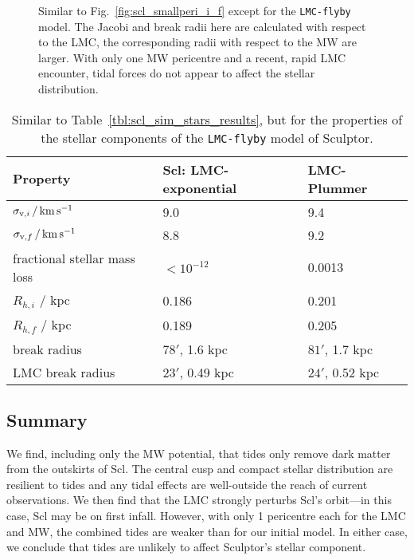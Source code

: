 \begin{figure}
\centering
{}
\caption[Sculptor initial and final density with LMC]{Similar to
Fig.~\ref{fig:scl_smallperi_i_f} except for the \texttt{LMC-flyby}
model. The Jacobi and break radii here are calculated with respect to
the LMC, the corresponding radii with respect to the MW are larger. With
only one MW pericentre and a recent, rapid LMC encounter, tidal forces
do not appear to affect the stellar
distribution.}\label{fig:scl_lmc_i_f}
\end{figure}

\begin{table*}[t]
\centering
\caption[Simulation results for Sculptor’s stars in the LMC+MW potential]{Similar to Table \ref{tbl:scl_sim_stars_results}, but for the properties of the stellar components of the \texttt{LMC-flyby} model of Sculptor. }
\label{tbl:scl_lmc_sim_stars}
\begin{tabular}{lll}
\toprule
Property & Scl: LMC-exponential & LMC-Plummer\\
\midrule
$\sigma_{{\rm v}, i}\,/\,{\rm km\,s^{-1}}$ & 9.0 & 9.4\\
$\sigma_{{\rm v}, f} \,/\,{\rm km\,s^{-1}}$ & 8.8 & 9.2\\
fractional stellar mass loss & $<10^{-12}$ & 0.0013\\
$R_{h, i}$ / kpc & 0.186 & 0.201\\
$R_{h, f}$ / kpc & 0.189 & 0.205\\
break radius & $78'$, 1.6 kpc & $81'$, 1.7 kpc\\
LMC break radius & $23'$, 0.49 kpc & $24'$, 0.52 kpc\\
\bottomrule
\end{tabular}
\end{table*}

\subsection{Summary}\label{summary}

We find, including only the MW potential, that tides only remove dark
matter from the outskirts of Scl. The central cusp and compact stellar
distribution are resilient to tides and any tidal effects are
well-outside the reach of current observations. We then find that the
LMC strongly perturbs Scl's orbit---in this case, Scl may be on first
infall. However, with only 1 pericentre each for the LMC and MW, the
combined tides are weaker than for our initial model. In either case, we
conclude that tides are unlikely to affect Sculptor's stellar component.

